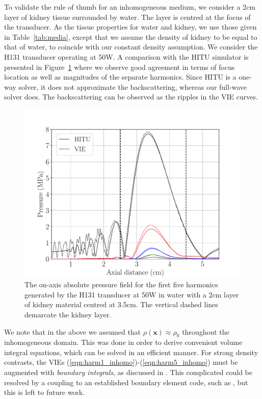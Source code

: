 \documentclass[11pt]{article}
\numberwithin{equation}{section}
\newcommand{\bx}{\mathbf{x}}
\begin{document}
{To validate the rule of thumb for an inhomogeneous medium, we consider a 2cm layer
of kidney tissue surrounded by water. The layer is centred at the focus of the transducer.
As the tissue properties for water and kidney, we use those given in Table~\ref{tab:media},
except that we assume the density of kidney to be equal to that of water, to coincide
with our constant density assumption. We consider the H131 transducer operating 
at 50W. A comparison with the HITU simulator is presented in Figure~\ref{fig:HITU_comparison_slab}
where we observe good agreement in terms of focus location as well as magnitudes of
the separate harmonics. Since HITU is a one-way solver, it does not approximate 
the backscattering, whereas our full-wave solver does. The backscattering can 
be observed as the ripples in the VIE curves.

\begin{figure}[h!]
    \centering
    \includegraphics[width=\linewidth]{Figure12}
    \caption{The on-axis absolute pressure field for the first five harmonics generated 
    by the H131 transducer at 50W in water with a 2cm layer of kidney material centred 
    at 3.5cm. The vertical dashed lines demarcate the kidney layer.}
    \label{fig:HITU_comparison_slab}
\end{figure}  

We note that in the above we assumed that $\rho(\bx)\approx\rho_0$ throughout 
the inhomogeneous domain. This was done in order to derive convenient volume integral 
equations, which can be solved in an efficient manner. For strong density contrasts, 
the VIEs (\ref{eqn:harm1_inhomo})-(\ref{eqn:harm5_inhomo}) must be augmented with 
\textit{boundary integrals}, as discussed in \cite{costabel2015spectrum}. This 
complicated could be resolved by a coupling to an established boundary element code, such 
as \cite{van2015fast}, but this is left to future work.
}
\end{document}

